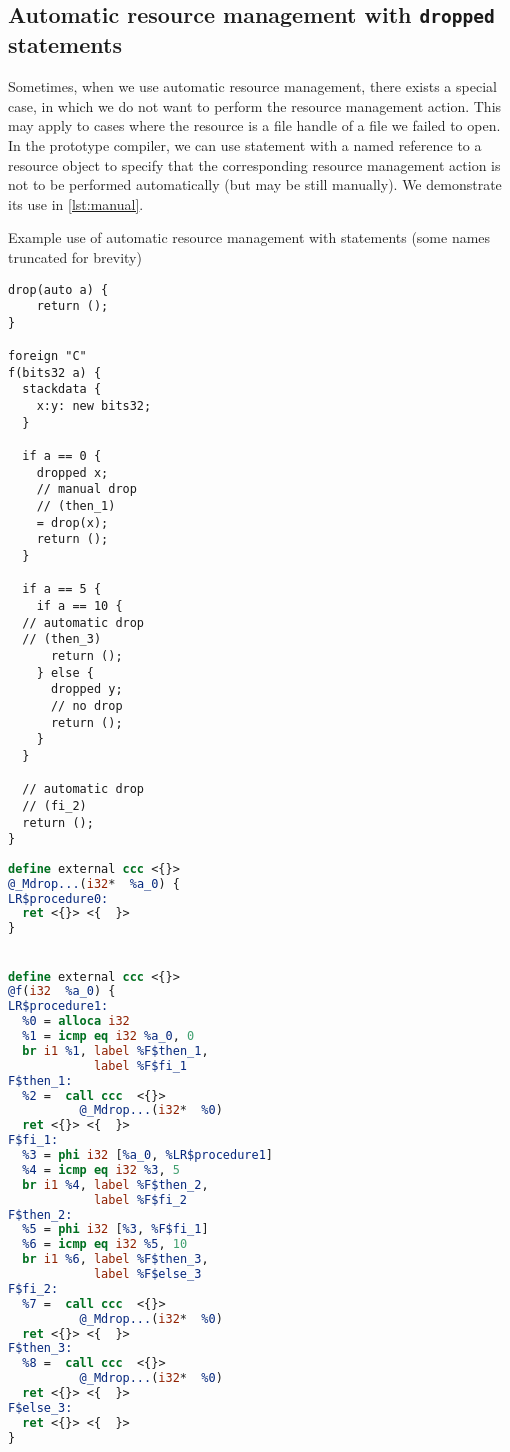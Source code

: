 \subsection{Automatic resource management with \texttt{dropped} statements}

Sometimes, when we use automatic resource management, there exists a special case, in which we do not want to perform the resource management action. This may apply to cases where the resource is a file handle of a file we failed to open. In the prototype compiler, we can use  statement with a named reference to a resource object to specify that the corresponding resource management action is not to be performed automatically (but may be still manually). We demonstrate its use in \cref{lst:manual}.


\begin{listing}
    \small
    \caption{Example use of automatic resource management with  statements (some names truncated for brevity)}
    \label{lst:manual}
    \begin{center}
    \begin{minipage}{0.35\linewidth}
    \begin{lstlisting}
drop(auto a) {
    return ();
}

foreign "C"
f(bits32 a) {
  stackdata {
    x:y: new bits32;
  }

  if a == 0 {
    dropped x;
    // manual drop
    // (then_1)
    = drop(x);
    return ();
  }

  if a == 5 {
    if a == 10 {
  // automatic drop
  // (then_3)
      return ();
    } else {
      dropped y;
      // no drop
      return ();
    }
  }

  // automatic drop
  // (fi_2)
  return ();
}
    \end{lstlisting}
    \end{minipage}%
    \begin{minipage}{0.65\linewidth}
    \begin{lstlisting}[language=LLVM]
define external ccc <{}>
@_Mdrop...(i32*  %a_0) {
LR$procedure0:
  ret <{}> <{  }>
}


define external ccc <{}>
@f(i32  %a_0) {
LR$procedure1:
  %0 = alloca i32
  %1 = icmp eq i32 %a_0, 0
  br i1 %1, label %F$then_1,
            label %F$fi_1
F$then_1:
  %2 =  call ccc  <{}>
          @_Mdrop...(i32*  %0)
  ret <{}> <{  }>
F$fi_1:
  %3 = phi i32 [%a_0, %LR$procedure1]
  %4 = icmp eq i32 %3, 5
  br i1 %4, label %F$then_2,
            label %F$fi_2
F$then_2:
  %5 = phi i32 [%3, %F$fi_1]
  %6 = icmp eq i32 %5, 10
  br i1 %6, label %F$then_3,
            label %F$else_3
F$fi_2:
  %7 =  call ccc  <{}>
          @_Mdrop...(i32*  %0)
  ret <{}> <{  }>
F$then_3:
  %8 =  call ccc  <{}>
          @_Mdrop...(i32*  %0)
  ret <{}> <{  }>
F$else_3:
  ret <{}> <{  }>
}
    \end{lstlisting}
    \end{minipage}
    \end{center}
\end{listing}

